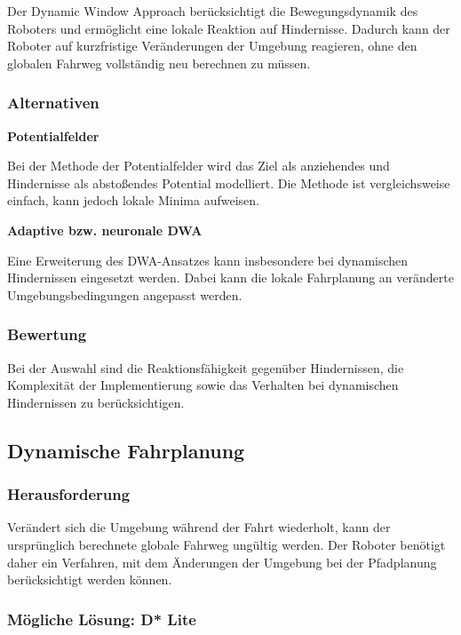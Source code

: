 \documentclass[
  a4paper,
  12pt,
  DIV=12,        %
  parskip=half,  %
  headings=small %
]{scrartcl}
\theoremstyle{definition}
\theoremstyle{definition}
\begin{document}
Der Dynamic Window Approach berücksichtigt die Bewegungsdynamik des
Roboters und ermöglicht eine lokale Reaktion auf Hindernisse. Dadurch
kann der Roboter auf kurzfristige Veränderungen der Umgebung reagieren,
ohne den globalen Fahrweg vollständig neu berechnen zu müssen.

\subsubsection{Alternativen}\label{alternativen-1}

\textbf{Potentialfelder}

Bei der Methode der Potentialfelder wird das Ziel als anziehendes und
Hindernisse als abstoßendes Potential modelliert. Die Methode ist
vergleichsweise einfach, kann jedoch lokale Minima aufweisen.

\textbf{Adaptive bzw. neuronale DWA}

Eine Erweiterung des DWA-Ansatzes kann insbesondere bei dynamischen
Hindernissen eingesetzt werden. Dabei kann die lokale Fahrplanung an
veränderte Umgebungsbedingungen angepasst werden.

\subsubsection{Bewertung}\label{bewertung-1}

Bei der Auswahl sind die Reaktionsfähigkeit gegenüber Hindernissen, die
Komplexität der Implementierung sowie das Verhalten bei dynamischen
Hindernissen zu berücksichtigen.

\subsection{Dynamische Fahrplanung}\label{dynamische-fahrplanung}

\subsubsection{Herausforderung}\label{herausforderung-2}

Verändert sich die Umgebung während der Fahrt wiederholt, kann der
ursprünglich berechnete globale Fahrweg ungültig werden. Der Roboter
benötigt daher ein Verfahren, mit dem Änderungen der Umgebung bei der
Pfadplanung berücksichtigt werden können.

\subsubsection{Mögliche Lösung: D*
Lite}\label{muxf6gliche-luxf6sung-d-lite}
\end{document}
